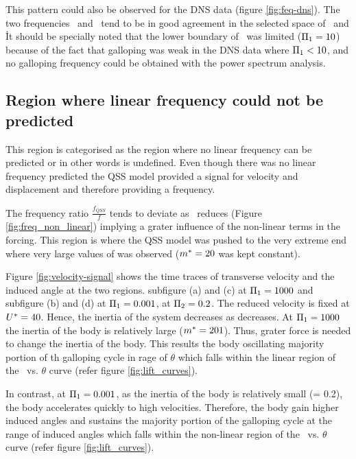 
 
 This pattern could also be observed for the DNS data (figure \ref{fig:feq-dns}). The two frequencies \freqlin\ and \freqdns\ tend to be in good agreement in the selected space of \massstiff\ and \massdamp\. It should be specially noted that the lower boundary of \massstiff\ was limited ($\Pi_1=10$) because of the fact that galloping was weak in the DNS data where $\Pi_1<10$, and no galloping frequency could be obtained with the power spectrum analysis. 


\subsection{Region where linear frequency could not be predicted}

This region is categorised as the region where no linear frequency can be predicted or in other words \freqlin is undefined. Even though there was no linear frequency predicted the QSS model provided a signal for velocity and displacement and therefore providing a frequency. 



The frequency ratio $\frac{f_{QSS}}{f}$ tends to deviate as \massstiff\ reduces (Figure \ref{fig:freq_non_linear}) implying a grater influence of the non-linear terms in the forcing. This region is where the QSS model was pushed to the very extreme end where very large values of \ustar was observed ($m^{*}=20$ was kept constant). 



Figure \ref{fig:velocity-signal} shows the time traces of transverse velocity and the induced angle at the two regions. subfigure (a) and (c) at $\Pi_1=1000$ and subfigure (b) and (d) at $\Pi_1=0.001$, at $\Pi_2=0.2$. The reduced velocity is fixed at $U^{*}=40$. Hence, the inertia of the system decreases as \massstiff decreases. At $\Pi_1=1000$ the inertia of the body is relatively large ($m^{*}=201$). Thus, grater force is needed to change the inertia of the body. This results the body oscillating majority portion of th galloping cycle in rage of $\theta$ which falls within the linear region of the \cy\ vs. $\theta$ curve (refer figure \ref{fig:lift_curves}).

In contrast, at $\Pi_1=0.001$, as the inertia of the body is relatively small (\mstar= 0.2), the body accelerates quickly to high velocities. Therefore, the body gain higher induced angles and sustains the majority portion of the galloping cycle at the range of induced angles which falls within the non-linear  region of the \cy\ vs. $\theta$ curve (refer figure \ref{fig:lift_curves}). 

